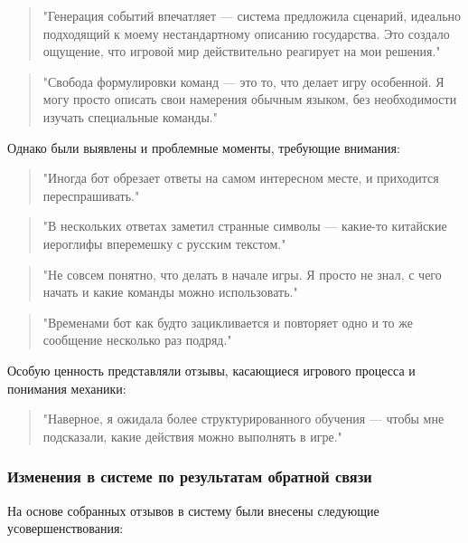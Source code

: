 \begin{quote}
"Генерация событий впечатляет — система предложила сценарий, идеально подходящий к моему нестандартному описанию государства. Это создало ощущение, что игровой мир действительно реагирует на мои решения."
\end{quote}

\begin{quote}
"Свобода формулировки команд — это то, что делает игру особенной. Я могу просто описать свои намерения обычным языком, без необходимости изучать специальные команды."
\end{quote}

Однако были выявлены и проблемные моменты, требующие внимания:

\begin{quote}
"Иногда бот обрезает ответы на самом интересном месте, и приходится переспрашивать."
\end{quote}

\begin{quote}
"В нескольких ответах заметил странные символы — какие-то китайские иероглифы вперемешку с русским текстом."
\end{quote}

\begin{quote}
"Не совсем понятно, что делать в начале игры. Я просто не знал, с чего начать и какие команды можно использовать."
\end{quote}

\begin{quote}
"Временами бот как будто зацикливается и повторяет одно и то же сообщение несколько раз подряд."
\end{quote}

Особую ценность представляли отзывы, касающиеся игрового процесса и понимания механики:

\begin{quote}
"Наверное, я ожидала более структурированного обучения — чтобы мне подсказали, какие действия можно выполнять в игре."
\end{quote}

\subsubsection{Изменения в системе по результатам обратной связи}

На основе собранных отзывов в систему были внесены следующие усовершенствования:

